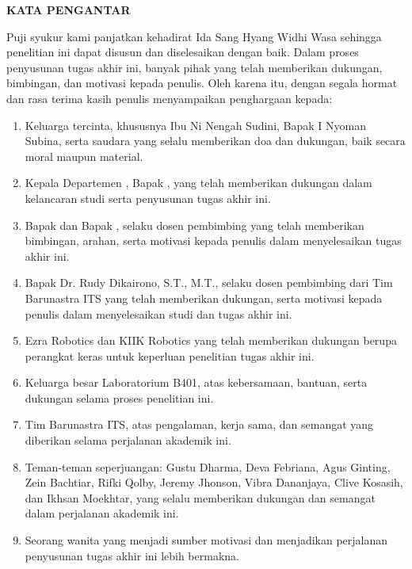\begin{center}
  \Large
  \textbf{KATA PENGANTAR}
\end{center}


\vspace{2ex}


Puji syukur kami panjatkan kehadirat Ida Sang Hyang Widhi Wasa  sehingga penelitian ini dapat disusun dan diselesaikan dengan baik. Dalam proses penyusunan tugas akhir ini, banyak pihak yang telah memberikan dukungan, bimbingan, dan motivasi kepada penulis. Oleh karena itu, dengan segala hormat dan rasa terima kasih  penulis menyampaikan penghargaan kepada:

\begin{enumerate}[nolistsep]
  \item Keluarga tercinta, khususnya Ibu Ni Nengah Sudini, Bapak I Nyoman Subina, serta saudara yang selalu memberikan doa dan dukungan, baik secara moral maupun material.
  \item Kepala Departemen \studyprogram{}, Bapak \headofdepartment{}, yang telah memberikan dukungan dalam kelancaran studi serta penyusunan tugas akhir ini.
  \item Bapak \advisor{} dan Bapak \coadvisor{}, selaku dosen pembimbing yang telah memberikan bimbingan, arahan, serta motivasi kepada penulis dalam menyelesaikan tugas akhir ini.
  \item Bapak Dr. Rudy Dikairono, S.T., M.T., selaku dosen pembimbing dari Tim Barunastra ITS yang telah memberikan dukungan, serta motivasi kepada penulis dalam menyelesaikan studi dan tugas akhir ini.
  \item Ezra Robotics dan KIIK Robotics yang telah memberikan dukungan berupa perangkat keras untuk keperluan penelitian tugas akhir ini.
  \item Keluarga besar Laboratorium B401, atas kebersamaan, bantuan, serta dukungan selama proses penelitian ini.
  \item Tim Barunastra ITS, atas pengalaman, kerja sama, dan semangat yang diberikan selama perjalanan akademik ini.
  \item Teman-teman seperjuangan: Gustu Dharma, Deva Febriana, Agus Ginting, Zein Bachtiar, Rifki Qolby, Jeremy Jhonson, Vibra Dananjaya, Clive Kosasih, dan Ikhsan Moekhtar, yang selalu memberikan dukungan dan semangat dalam perjalanan akademik ini.
  \item Seorang wanita yang menjadi sumber motivasi dan menjadikan perjalanan penyusunan tugas akhir ini lebih bermakna.
\end{enumerate}

